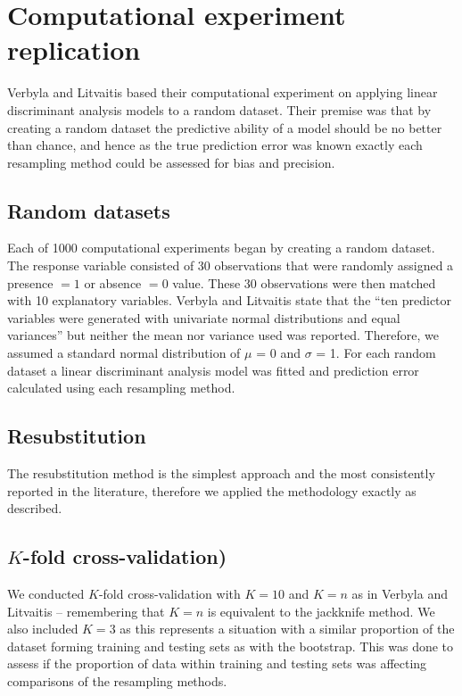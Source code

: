 \section{Computational experiment replication}

Verbyla and Litvaitis\supercite{verbyla-1989} based their computational experiment
on applying linear discriminant analysis models to a random dataset.
Their premise was that by creating a random dataset the predictive
ability of a model should be no better than chance, and hence as the
true prediction error was known exactly each resampling method could be
assessed for bias and precision.

\subsection{Random datasets}

Each of 1000 computational experiments began by creating a random
dataset. The response variable consisted of 30 observations that were
randomly assigned a presence $=1$ or absence $=0$ value. These 30
observations were then matched with 10 explanatory variables. Verbyla and Litvaitis\supercite{verbyla-1989} 
state that the ``ten predictor variables were
generated with univariate normal distributions and equal variances'' but
neither the mean nor variance used was reported. Therefore, we assumed a
standard normal distribution of $\mu$ = 0 and $\sigma$ = 1. For each random
dataset a linear discriminant analysis model was fitted and prediction error
calculated using each resampling method.

\subsection{Resubstitution}

The resubstitution method is the simplest approach and the most
consistently reported in the literature, therefore we applied the
methodology exactly as described.

\subsection{$K$-fold cross-validation)}

We conducted $K$-fold cross-validation with $K=10$ and $K=n$ as in
Verbyla and Litvaitis\supercite{verbyla-1989} -- remembering that $K=n$ is
equivalent to the jackknife method. We also included $K=3$ as this
represents a situation with a similar proportion of the dataset forming
training and testing sets as with the bootstrap. This was done to assess
if the proportion of data within training and testing sets was affecting
comparisons of the resampling methods.

